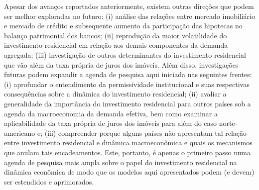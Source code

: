 Apesar dos avanços reportados anteriormente, existem outras direções que podem ser melhor exploradas no futuro: (i) análise das relações entre mercado imobiliário e mercado de crédito e subsequente aumento da participação das hipotecas no balanço patrimonial dos bancos; (ii) reprodução da maior volatilidade do investimento residencial em relação aos demais componentes da demanda agregada; (iii) investigação de outros determinantes do investimento residencial que vão além da taxa própria de juros dos imóveis.
Além disso, investigações futuras podem expandir a agenda de pesquisa aqui iniciada nas seguintes frentes:
	(i) aprofundar o entendimento da permissividade institucional e suas respectivas consequências sobre a dinâmica do investimento residencial; 
	(ii) avaliar a generalidade da importância do investimento residencial para outros países sob a agenda da macroeconomia da demanda efetiva, bem como examinar a aplicabilidade da taxa própria de juros dos imóveis para além do caso norte-americano e;
	(iii) compreender porque alguns países não apresentam tal relação entre investimento residencial e dinâmica macroeconômica e quais os mecanismos que anulam tais encadeamentos.
Este, portanto, é apenas o primeiro passo numa agenda de pesquisa mais ampla sobre o papel do investimento residencial na dinâmica econômica de modo que os modelos aqui apresentados podem (e devem) ser estendidos e aprimorados.